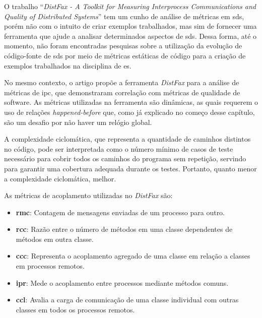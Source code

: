 O trabalho ``\textit{DistFax - A Toolkit for Measuring Interprocess Communications and Quality of Distributed Systems}''\cite{DistFax} tem um cunho de análise de métricas em \gls{sds}, porém não com o intuito de criar exemplos trabalhados, mas sim de fornecer uma ferramenta que ajude a analisar determinados aspectos de \gls{sds}. Dessa forma, até o momento, não foram encontradas pesquisas sobre a utilização da evolução de código-fonte de \gls{sds} por meio de métricas estáticas de código para a criação de exemplos trabalhados na disciplina de \gls{es}.

No mesmo contexto, o artigo propõe a ferramenta \textit{DistFax} para a análise de métricas de \gls{ipc}, que demonstraram correlação com métricas de qualidade de software. As métricas utilizadas na ferramenta são dinâmicas, as quais requerem o uso de relações \textit{happened-before} que, como já explicado no começo desse capítulo, são um desafio por não haver um relógio global.

A complexidade ciclomática, que representa a quantidade de caminhos distintos no código, pode ser interpretada como o número mínimo de casos de teste necessário para cobrir todos os caminhos do programa sem repetição, servindo para garantir uma cobertura adequada durante os testes. Portanto, quanto menor a complexidade ciclomática, melhor.

As métricas de acoplamento utilizadas no \textit{DistFax} são:
\begin{itemize}
    \item \textbf{\gls{rmc}}: Contagem de mensagens enviadas de um processo para outro.
    \item \textbf{\gls{rcc}}: Razão entre o número de métodos em uma classe dependentes de métodos em outra classe.
    \item \textbf{\gls{ccc}}: Representa o acoplamento agregado de uma classe em relação a classes em processos remotos.
    \item \textbf{\gls{ipr}}: Mede o acoplamento entre processos mediante métodos comuns.
    \item \textbf{\gls{ccl}}: Avalia a carga de comunicação de uma classe individual com outras classes em todos os processos remotos.
\end{itemize}

